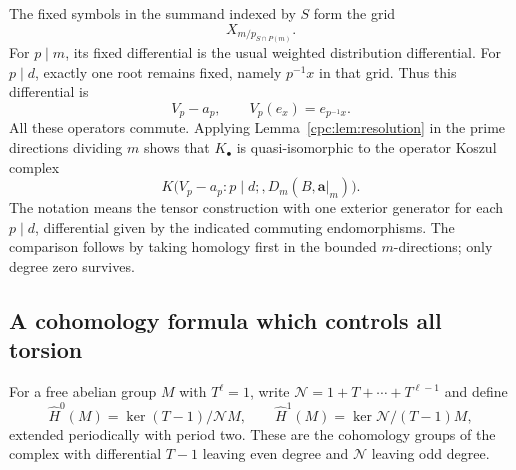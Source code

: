The fixed symbols in the summand indexed by $S$ form the grid
\[
 X_{m/p_{S\cap P(m)}}.
\]
For $p\mid m$, its fixed differential is the usual weighted
distribution differential. For $p\mid d$, exactly one root remains
fixed, namely $p^{-1}x$ in that grid. Thus this differential is
\begin{equation}\label{cpc:eq:fixedoperator}
 V_p-a_p,\qquad V_p(e_x)=e_{p^{-1}x}.
\end{equation}
All these operators commute. Applying Lemma~\ref{cpc:lem:resolution}
in the prime directions dividing $m$ shows that $K_\bullet$ is
quasi-isomorphic to the operator Koszul complex
\begin{equation}\label{cpc:eq:operatorKoszul}
 K\bigl(V_p-a_p:p\mid d;,D_m(B,\mathbf a|_m)\bigr).
\end{equation}
The notation means the tensor construction with one exterior
generator for each $p\mid d$, differential given by the indicated
commuting endomorphisms. The comparison follows by taking homology
first in the bounded $m$-directions; only degree zero survives.

\subsection{A cohomology formula which controls all torsion}

For a free abelian group $M$ with $T^\ell=1$, write
$\mathcal N=1+T+\cdots+T^{\ell-1}$ and define
\[
 \widehat H^0(M)=\ker(T-1)/\mathcal N M,
 \qquad
 \widehat H^1(M)=\ker\mathcal N/(T-1)M,
\]
extended periodically with period two. These are the cohomology
groups of the complex with differential $T-1$ leaving even degree
and $\mathcal N$ leaving odd degree.

